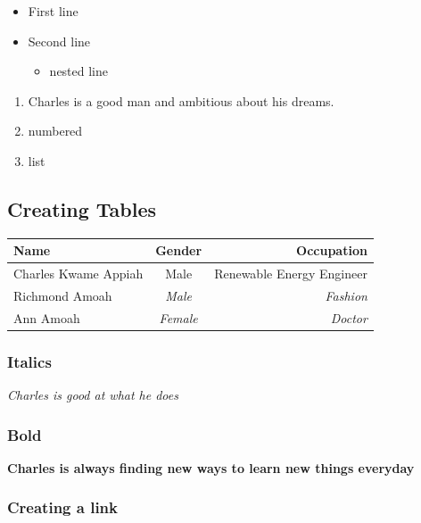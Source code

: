 \documentclass[
]{article}
\providecommand{\tightlist}{%
  \setlength{\itemsep}{0pt}\setlength{\parskip}{0pt}}
\begin{document}
\begin{itemize}
\tightlist
\item
  First line
\item
  Second line

  \begin{itemize}
  \tightlist
  \item
    nested line
  \end{itemize}
\end{itemize}

\begin{enumerate}
\def\labelenumi{\arabic{enumi}.}
\tightlist
\item
  Charles is a good man and ambitious about his dreams.
\item
  numbered
\item
  list
\end{enumerate}

\subsection{Creating Tables}\label{creating-tables}

\begin{longtable}[]{@{}lcr@{}}
\toprule\noalign{}
Name & Gender & Occupation \\
\midrule\noalign{}
\endhead
\bottomrule\noalign{}
\endlastfoot
Charles Kwame Appiah & Male & Renewable Energy Engineer \\
Richmond Amoah & \emph{Male} & \emph{Fashion} \\
Ann Amoah & \emph{Female} & \emph{Doctor} \\
\end{longtable}

\subsubsection{Italics}\label{italics}

\emph{Charles is good at what he does}

\subsubsection{Bold}\label{bold}

\textbf{Charles is always finding new ways to learn new things everyday}

\subsubsection{Creating a link}\label{creating-a-link}
\end{document}
